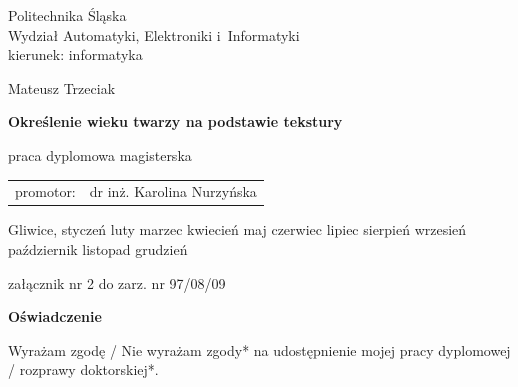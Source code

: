 \documentclass[a4paper,twoside,12pt]{book}
\newcommand{\miesiac}{%
  \ifcase\the\month
  \or styczeń%
  \or luty%
  \or marzec%
  \or kwiecień%
  \or maj%
  \or czerwiec%
  \or lipiec%
  \or sierpień%
  \or wrzesień%
  \or październik%
  \or listopad%
  \or grudzień%
  \fi}
\newcommand{\autor}{Mateusz Trzeciak}
\newcommand{\promotor}{dr inż. Karolina Nurzyńska}
\newcommand{\tytul}{Określenie wieku twarzy na podstawie tekstury}
\begin{document}
	
\pagestyle{empty}
\sffamily

\noindent

\begin{center}
    \large
    Politechnika Śląska\\
    Wydział Automatyki, Elektroniki i~Informatyki \\ 
    kierunek: informatyka
\end{center}

\vfill\vfill
\begin{center}
    \large
    \autor
\end{center}

\vfill
\begin{center}
   \LARGE\bfseries \tytul
\end{center}

\vfill
\begin{center}
    \large
    praca dyplomowa magisterska
\end{center}

\vfill\vfill\vfill
\begin{center}
    \large
    \begin{tabular}{ll}
    promotor: & \promotor \\
    \end{tabular}

\end{center}

\vfill
\begin{center}
\large
   Gliwice,  \miesiac\ \the\year
\end{center}

\cleardoublepage
 

\rmfamily
\normalfont

\cleardoublepage

\begin{flushright}
załącznik nr 2 do zarz. nr 97/08/09 
\end{flushright}

\vfill  

\begin{center}
\Large\bfseries Oświadczenie
\end{center}

\vfill

Wyrażam  zgodę / Nie wyrażam zgody*  na  udostępnienie  mojej  pracy  dyplomowej / rozprawy doktorskiej*.
\end{document}
